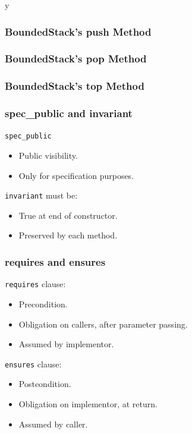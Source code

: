 \if y\MAKEHANDOUTS \documentclass[compress,landscape,handout]{beamer}
\begin{document}
\begin{frame}[fragile]
\frametitle{BoundedStack's push Method}

\end{frame}

\begin{frame}[fragile]
\frametitle{BoundedStack's pop Method}

\end{frame}

\begin{frame}[fragile]
\frametitle{BoundedStack's top Method}

\end{frame}

\begin{frame}[fragile]
\frametitle{spec\_public and invariant}

\lstinline!spec_public!
\begin{itemize}
\item
Public visibility.

\item
Only for specification purposes.
\end{itemize}


\lstinline!invariant! must be:
\begin{itemize}
\item
True at end of constructor.

\item
Preserved by each method.
\end{itemize}

\end{frame}

\begin{frame}[fragile]
\frametitle{requires and ensures}

\lstinline!requires! clause:
\begin{itemize}
\item
Precondition.

\item
Obligation on callers, after parameter passing.

\item
Assumed by implementor.
\end{itemize}

\lstinline!ensures! clause:
\begin{itemize}
\item
Postcondition.

\item
Obligation on implementor, at return.

\item
Assumed by caller.
\end{itemize}
\end{frame}
\end{document}
